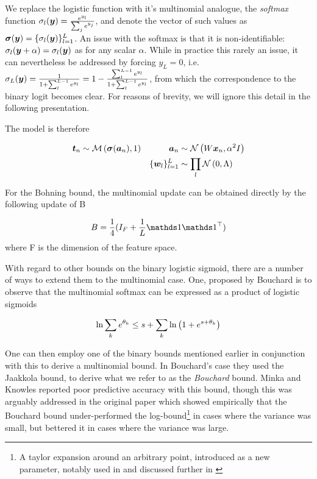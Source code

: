 We replace the logistic function with it's multinomial analogue, the \emph{softmax} function $\sigma_l(\bm y) = \frac{e^{y_l}}{\sum_j e^{y_j}}$, and denote the vector of such values as $\bm \sigma(\bm y) = \{ \sigma_l(\bm y) \}_{l=1}^{L}$. An issue with the softmax is that it is non-identifiable: $\sigma_l (\bm y + \alpha) = \sigma_l(\bm y)$ as for any scalar $\alpha$. While in practice this rarely an issue, it can nevertheless be addressed by forcing $y_L = 0$, i.e. $\sigma_L(\bm y) = \frac{1}{1 + \sum_l^{L-1} e^{y_l}} = 1 - \frac{\sum_l^{L-1} e^{y_l}}{1 + \sum_l^{L-1} e^{y_l}}$, from which the correspondence to the binary logit becomes clear. For reasons of brevity, we will ignore this detail in the following presentation.

The model is therefore

\begin{align}
\bm t_n & \sim \mathcal{M} \left( {\bm \sigma(\bm a_n)},{1} \right) & \bm a_n & \sim \mathcal{N} \left( {W \bm x_n}, {\alpha^2 I} \right) \\
 & & \{\bm w_l\}_{l = 1}^{L} & \sim \prod_l \mathcal{N} \left( {0}, {\Lambda} \right)
\end{align}

For the Bohning bound, the multinomial update can be obtained directly by the following update of B\cite{BohningLogReg1988}

\begin{equation}
B = \frac{1}{4} (I_F + \frac{1}{L}\one \one\T)
\end{equation}
where F is the dimension of the feature space.

With regard to other bounds on the binary logistic sigmoid, there are a number of ways to extend them to the multinomial case. One, proposed by Bouchard\cite{Bouchard2007} is to observe that the multinomial softmax can be expressed as a product of logistic sigmoids

\begin{equation}
\ln \sum_k e^{\theta_k} \leq s + \sum_k { \ln \left( 1 + e^{ s + \theta_k } \right) }
\end{equation}

One can then employ one of the binary bounds mentioned earlier in conjunction with this to derive a multinomial bound. In Bouchard's case they used the Jaakkola bound, to derive what we refer to as the \emph{Bouchard} bound. Minka and Knowles reported poor predictive accuracy with this bound\cite{MinkaKnowles}, though this was arguably addressed in the original paper which showed empirically that the Bouchard bound under-performed the log-bound\footnote{A taylor expansion around an arbitrary point, introduced as a new parameter, notably used in\cite{Blei2006} and discussed further in \cite{Wang2013a}} in cases where the variance was small, but bettered it in cases where the variance was large.


